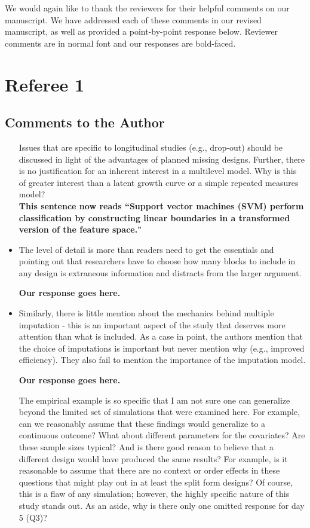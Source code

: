 \documentclass[letterpaper,12pt]{article}
\begin{document}
 We would again like to thank the reviewers for their helpful comments on our manuscript.  We have addressed each of these comments in our revised manuscript, as well as provided a point-by-point response below. Reviewer comments are in normal font and our responses are bold-faced.  


\section{Referee 1}
\subsection{Comments to the Author}
\begin{itemize}
\item [Issues] that are specific to longitudinal studies (e.g., drop-out) should be discussed in light of the advantages of planned missing designs. Further, there is no justification for an inherent interest in a multilevel model. Why is this of greater interest than a latent growth curve or a simple repeated measures model?\\

{\bf This sentence now reads ``Support vector machines (SVM) perform classification by constructing linear boundaries in a transformed version of the feature space." }\\

\item  The level of detail is more than readers need to get the essentials and pointing out that researchers have to choose how many blocks to include in any design is extraneous information and distracts from the larger argument.

{\bf Our response goes here.}

\item Similarly, there is little mention about the mechanics behind multiple imputation - this is an important aspect of the study that deserves more attention than what is included. As a case in point, the authors mention that the choice of imputations is important but never mention why (e.g., improved efficiency). They also fail to mention the importance of the imputation model.

{\bf Our response goes here.}

\item [The] empirical example is so specific that I am not sure one can generalize beyond the limited set of simulations that were examined here.  For example, can we reasonably assume that these findings would generalize to a continuous outcome? What about different parameters for the covariates? Are these sample sizes typical? And is there good reason to believe that a different design would have produced the same results? For example, is it reasonable to assume that there are no context or order effects in these questions that might play out in at least the split form designs?  Of course, this is a flaw of any simulation; however, the highly specific nature of this study stands out. As an aside, why is there only one omitted response for day 5 (Q3)?


\end{itemize}
\end{document}
